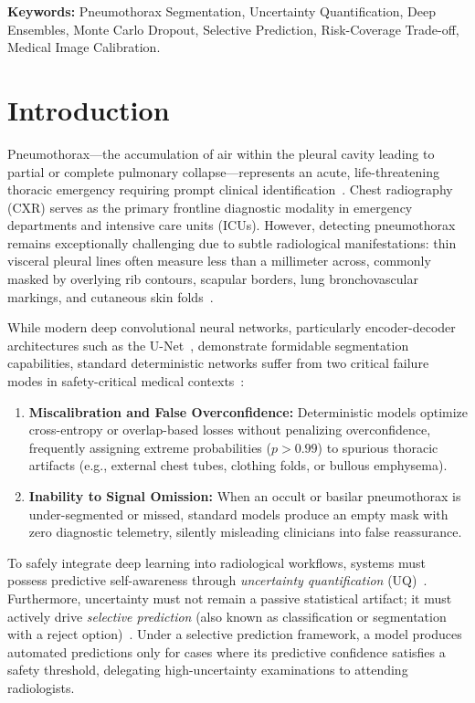 \documentclass[11pt,a4paper]{article}
\begin{document}
\noindent\textbf{Keywords:} Pneumothorax Segmentation, Uncertainty Quantification, Deep Ensembles, Monte Carlo Dropout, Selective Prediction, Risk-Coverage Trade-off, Medical Image Calibration.

\section{Introduction}
\label{sec:intro}

Pneumothorax—the accumulation of air within the pleural cavity leading to partial or complete pulmonary collapse—represents an acute, life-threatening thoracic emergency requiring prompt clinical identification~\cite{siim2019pneumothorax}. Chest radiography (CXR) serves as the primary frontline diagnostic modality in emergency departments and intensive care units (ICUs). However, detecting pneumothorax remains exceptionally challenging due to subtle radiological manifestations: thin visceral pleural lines often measure less than a millimeter across, commonly masked by overlying rib contours, scapular borders, lung bronchovascular markings, and cutaneous skin folds~\cite{rajpurkar2018deep}.

While modern deep convolutional neural networks, particularly encoder-decoder architectures such as the U-Net~\cite{ronneberger2015u}, demonstrate formidable segmentation capabilities, standard deterministic networks suffer from two critical failure modes in safety-critical medical contexts~\cite{kompa2021second, ovadia2019can}:
\begin{enumerate}
    \item \textbf{Miscalibration and False Overconfidence:} Deterministic models optimize cross-entropy or overlap-based losses without penalizing overconfidence, frequently assigning extreme probabilities ($p > 0.99$) to spurious thoracic artifacts (e.g., external chest tubes, clothing folds, or bullous emphysema).
    \item \textbf{Inability to Signal Omission:} When an occult or basilar pneumothorax is under-segmented or missed, standard models produce an empty mask with zero diagnostic telemetry, silently misleading clinicians into false reassurance.
\end{enumerate}

To safely integrate deep learning into radiological workflows, systems must possess predictive self-awareness through \textit{uncertainty quantification} (UQ)~\cite{kendall2017uncertainties, gal2016dropout}. Furthermore, uncertainty must not remain a passive statistical artifact; it must actively drive \textit{selective prediction} (also known as classification or segmentation with a reject option)~\cite{geifman2017selective, geifman2019selectivenet}. Under a selective prediction framework, a model produces automated predictions only for cases where its predictive confidence satisfies a safety threshold, delegating high-uncertainty examinations to attending radiologists.
\end{document}
